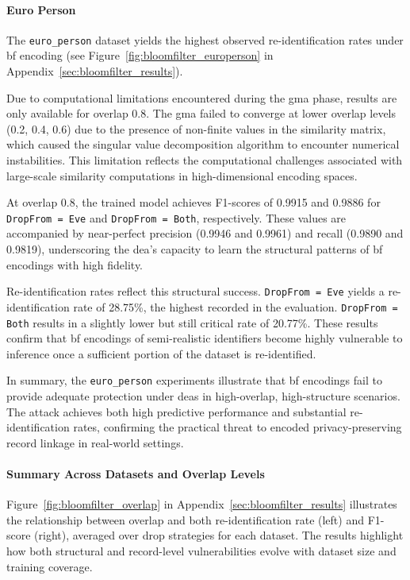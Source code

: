 \paragraph{Euro Person}

The \texttt{euro\_person} dataset yields the highest observed re-identification rates under \ac{bf} encoding (see Figure~\ref{fig:bloomfilter_europerson} in Appendix~\ref{sec:bloomfilter_results}).

Due to computational limitations encountered during the \ac{gma} phase, results are only available for overlap 0.8.
The \ac{gma} failed to converge at lower overlap levels (0.2, 0.4, 0.6) due to the presence of non-finite values in the similarity matrix, which caused the singular value decomposition algorithm to encounter numerical instabilities.
This limitation reflects the computational challenges associated with large-scale similarity computations in high-dimensional encoding spaces.

At overlap 0.8, the trained model achieves F1-scores of 0.9915 and 0.9886 for \texttt{DropFrom = Eve} and \texttt{DropFrom = Both}, respectively.
These values are accompanied by near-perfect precision (0.9946 and 0.9961) and recall (0.9890 and 0.9819), underscoring the \ac{dea}'s capacity to learn the structural patterns of \ac{bf} encodings with high fidelity.

Re-identification rates reflect this structural success.
\texttt{DropFrom = Eve} yields a re-identification rate of 28.75\%, the highest recorded in the evaluation.
\texttt{DropFrom = Both} results in a slightly lower but still critical rate of 20.77\%.
These results confirm that \ac{bf} encodings of semi-realistic identifiers become highly vulnerable to inference once a sufficient portion of the dataset is re-identified.

In summary, the \texttt{euro\_person} experiments illustrate that \ac{bf} encodings fail to provide adequate protection under \ac{dea}s in high-overlap, high-structure scenarios.
The attack achieves both high predictive performance and substantial re-identification rates, confirming the practical threat to encoded privacy-preserving record linkage in real-world settings.


\paragraph{Summary Across Datasets and Overlap Levels}

Figure~\ref{fig:bloomfilter_overlap} in Appendix~\ref{sec:bloomfilter_results} illustrates the relationship between overlap and both re-identification rate (left) and F1-score (right), averaged over drop strategies for each dataset.
The results highlight how both structural and record-level vulnerabilities evolve with dataset size and training coverage.

